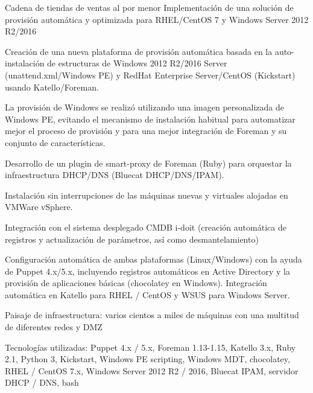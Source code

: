 \begin{cventries}
  \cventry
    {Cadena de tiendas de ventas al por menor}
    {Implementación de una solución de provisión automática y optimizada para RHEL/CentOS 7 y Windows Server 2012 R2/2016}
    {}
    {}
    {
      \begin{cvitems}
        \item Creación de una nueva plataforma de provisión automática basada en la auto-instalación de estructuras de
        Windows 2012 R2/2016 Server (unattend.xml/Windows PE) y RedHat Enterprise Server/CentOS (Kickstart) usando Katello/Foreman.
        \item La provisión de Windows se realizó utilizando una imagen personalizada de Windows PE, evitando el mecanismo de instalación habitual para automatizar mejor el proceso de provisión y para una mejor integración de Foreman y su conjunto de características.
        \item Desarrollo de un plugin de smart-proxy de Foreman (Ruby) para orquestar la infraestructura DHCP/DNS (Bluecat DHCP/DNS/IPAM).
        \item Instalación sin interrupciones de las máquinas nuevas y virtuales alojadas en VMWare vSphere.
        \item Integración con el sistema desplegado CMDB i-doit (creación automática de registros y actualización de parámetros, así como desmantelamiento)
        \item Configuración automática de ambas plataformas (Linux/Windows) con la ayuda de Puppet 4.x/5.x,
        incluyendo registros automáticos en Active Directory y la provisión de aplicaciones básicas
        (chocolatey en Windows). Integración automática en Katello para RHEL / CentOS y WSUS para Windows Server.
        \item Paisaje de infraestructura: varios cientos a miles de máquinas con una multitud de diferentes redes y DMZ
        \item Tecnologías utilizadas: Puppet 4.x / 5.x, Foreman 1.13-1.15, Katello 3.x, Ruby 2.1, Python 3, Kickstart, Windows PE scripting, Windows MDT, chocolatey, RHEL / CentOS 7.x, Windows Server 2012 R2 / 2016, Bluecat IPAM, servidor DHCP / DNS, bash
      \end{cvitems}
    }


\end{cventries}
